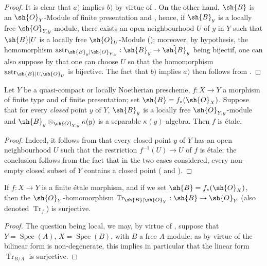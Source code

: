\begin{proof}
It is clear that $a)$ implies $b)$ by virtue of .
On the other hand, $\sh{B}$ is an $\sh{O}_Y$-Module of finite presentation  and , hence, if $\sh{B}_y$ is a locally free $\sh{O}_{Y,y}$-module, there exists an open neighbourhood $U$ of $y$ in $Y$ such that $\sh{B}|U$ is a locally free $\sh{O}_U$-Module ();
moreover, by hypothesis, the homomorphism $\operatorname{astr}_{\sh{B}_y|\sh{O}_{Y,y}}:\sh{B}_y\to\check{\sh{B}}_y$ being bijectif, one can also suppose by  that one can choose $U$ so that
the homomorphism $\operatorname{astr}_{\sh{B}|U,\sh{O}_U}$ is bijective.
The fact that $b)$ implies $a)$ then follows from .
\end{proof}

\begin{corollary}[18.2.5]
\label{IV.18.2.5}
Let $Y$ be a quasi-compact or locally Noetherian prescheme, $f:X\to Y$ a morphism of finite type and of finite presentation;
set $\sh{B}=f_*(\sh{O}_X)$.
Suppose that for every \emph{closed} point $y$ of $Y$, $\sh{B}_y$ is a locally free $\sh{O}_{Y,y}$-module and $\sh{B}_y\otimes_{\sh{O}_{Y,y}}\kappa(y)$ is a separable $\kappa(y)$-algebra.
Then $f$ is \'etale.
\end{corollary}

\begin{proof}
Indeed, it follows from  that every closed point $y$ of $Y$ has an open neighbourhood $U$ such that the restriction $f^{-1}(U)\to U$ of $f$ is \'etale;
the conclusion follows from the fact that in the two cases considered, every non-empty closed subset of $Y$ contains a closed point ( and ).
\end{proof}

\begin{corollary}[18.2.6]
\label{IV.18.2.6}
If $f:X\to Y$ is a finite \'etale morphism, and if we set $\sh{B}=f_*(\sh{O}_X)$, then the $\sh{O}_Y$-homomorphism $\operatorname{Tr}_{\sh{B}|\sh{O}_Y}:\sh{B}\to\sh{O}_Y$  (also denoted $\operatorname{Tr}_f$) is surjective.
\end{corollary}

\begin{proof}
The question being local, we may, by virtue of , suppose that $Y=\operatorname{Spec}(A)$, $X=\operatorname{Spec}(B)$, with $B$ a free $A$-module;
as by virtue of  the bilinear form  is non-degenerate, this implies in particular that the linear form $\operatorname{Tr}_{B/A}$ is surjective.
\end{proof}


